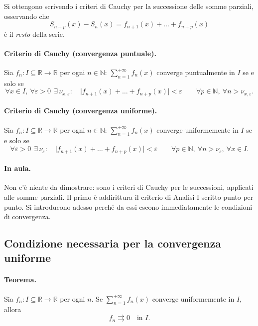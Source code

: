 Si ottengono scrivendo i criteri di Cauchy per la successione delle somme parziali,
osservando che
\[
S_{n+p}(x)-S_n(x)=f_{n+1}(x)+\dots+f_{n+p}(x)
\]
è il \emph{resto} della serie.

\paragraph{Criterio di Cauchy (convergenza puntuale).}
Sia $f_n:I\subseteq\mathbb{R}\to\mathbb{R}$ per ogni $n\in\mathbb{N}$:
$\sum_{n=1}^{+\infty}f_n(x)$
converge puntualmente in $I$ se e solo se
\begin{equation}
\forall x\in I,\ \forall\varepsilon>0\ \ \exists\,\nu_{x,\varepsilon}:\quad
\big|f_{n+1}(x)+\dots+f_{n+p}(x)\big|<\varepsilon
\qquad\forall p\in\mathbb{N},\ \forall n>\nu_{x,\varepsilon}.
\end{equation}

\paragraph{Criterio di Cauchy (convergenza uniforme).}
Sia $f_n:I\subseteq\mathbb{R}\to\mathbb{R}$ per ogni $n\in\mathbb{N}$:
$\sum_{n=1}^{+\infty}f_n(x)$
converge uniformemente in $I$ se e solo se
\begin{equation}
\forall\varepsilon>0\ \ \exists\,\nu_{\varepsilon}:\quad
\big|f_{n+1}(x)+\dots+f_{n+p}(x)\big|<\varepsilon
\qquad\forall p\in\mathbb{N},\ \forall n>\nu_{\varepsilon},\ \forall x\in I.
\end{equation}

\paragraph{In aula.} Non c'è niente da dimostrare: sono i criteri di Cauchy per le
successioni, applicati alle somme parziali. Il primo è addirittura il criterio di Analisi I
scritto punto per punto. Si introducono adesso perché da essi escono immediatamente le
condizioni di convergenza.

\subsection{Condizione necessaria per la convergenza uniforme}

\paragraph{Teorema.} Sia $f_n:I\subseteq\mathbb{R}\to\mathbb{R}$ per ogni $n$. Se
$\sum_{n=1}^{+\infty}f_n(x)$ converge uniformemente in $I$, allora
\begin{equation}
f_n\rightrightarrows 0\quad\text{in }I .
\end{equation}

